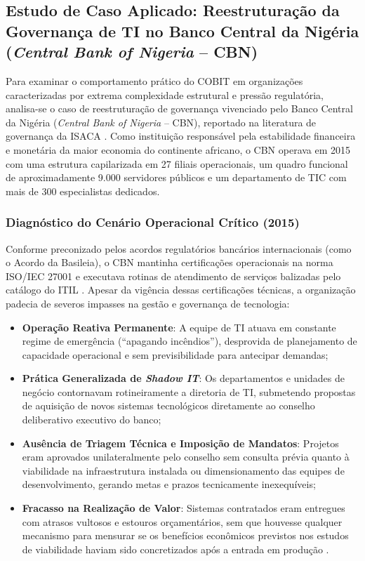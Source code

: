 \subsection{Estudo de Caso Aplicado: Reestruturação da Governança de TI no Banco Central da Nigéria (\textit{Central Bank of Nigeria} -- CBN)}

Para examinar o comportamento prático do COBIT em organizações caracterizadas por extrema complexidade estrutural e pressão regulatória, analisa-se o caso de reestruturação de governança vivenciado pelo Banco Central da Nigéria (\textit{Central Bank of Nigeria} -- CBN), reportado na literatura de governança da ISACA \cite{teitler2022case}. Como instituição responsável pela estabilidade financeira e monetária da maior economia do continente africano, o CBN operava em 2015 com uma estrutura capilarizada em 27 filiais operacionais, um quadro funcional de aproximadamente 9.000 servidores públicos e um departamento de TIC com mais de 300 especialistas dedicados.

\subsubsection{Diagnóstico do Cenário Operacional Crítico (2015)}

Conforme preconizado pelos acordos regulatórios bancários internacionais (como o Acordo da Basileia), o CBN mantinha certificações operacionais na norma ISO/IEC 27001 e executava rotinas de atendimento de serviços balizadas pelo catálogo do ITIL \cite{teitler2022case}. Apesar da vigência dessas certificações técnicas, a organização padecia de severos impasses na gestão e governança de tecnologia:

\begin{itemize}
    \item \textbf{Operação Reativa Permanente}: A equipe de TI atuava em constante regime de emergência (``apagando incêndios''), desprovida de planejamento de capacidade operacional e sem previsibilidade para antecipar demandas;
    \item \textbf{Prática Generalizada de \textit{Shadow IT}}: Os departamentos e unidades de negócio contornavam rotineiramente a diretoria de TI, submetendo propostas de aquisição de novos sistemas tecnológicos diretamente ao conselho deliberativo executivo do banco;
    \item \textbf{Ausência de Triagem Técnica e Imposição de Mandatos}: Projetos eram aprovados unilateralmente pelo conselho sem consulta prévia quanto à viabilidade na infraestrutura instalada ou dimensionamento das equipes de desenvolvimento, gerando metas e prazos tecnicamente inexequíveis;
    \item \textbf{Fracasso na Realização de Valor}: Sistemas contratados eram entregues com atrasos vultosos e estouros orçamentários, sem que houvesse qualquer mecanismo para mensurar se os benefícios econômicos previstos nos estudos de viabilidade haviam sido concretizados após a entrada em produção \cite{teitler2022case,weill2004governance}.
\end{itemize}

